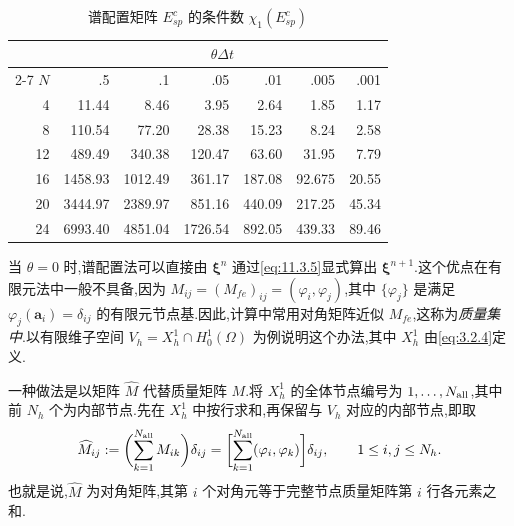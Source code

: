 \begin{table}[htbp]
  \centering
  \caption{谱配置矩阵 \(E_{sp}^c\) 的条件数 \(\chi_1(E_{sp}^c)\)}\label{tab:11.4.2}
  \begin{tabular}{rrrrrrr}
    \toprule
       & \multicolumn{6}{c}{\(\theta\Delta t\)}\\
    \cmidrule(lr){2-7}
    \(N\) & .5 & .1 & .05 & .01 & .005 & .001\\
    \midrule
     4 &   11.44 &    8.46 &    3.95 &   2.64 &   1.85  &  1.17\\
     8 &  110.54 &   77.20 &   28.38 &  15.23 &   8.24  &  2.58\\
    12 &  489.49 &  340.38 &  120.47 &  63.60 &  31.95  &  7.79\\
    16 & 1458.93 & 1012.49 &  361.17 & 187.08 &  92.675 & 20.55\\
    20 & 3444.97 & 2389.97 &  851.16 & 440.09 & 217.25  & 45.34\\
    24 & 6993.40 & 4851.04 & 1726.54 & 892.05 & 439.33  & 89.46\\
    \bottomrule
  \end{tabular}
\end{table}

当 \(\theta=0\) 时,谱配置法可以直接由 \(\boldsymbol{\xi}^n\) 通过\eqref{eq:11.3.5}显式算出 \(\boldsymbol{\xi}^{n+1}\).这个优点在有限元法中一般不具备,因为 \(M_{ij}=(M_{fe})_{ij}=(\varphi_i,\varphi_j)\),其中 \(\{\varphi_j\}\) 是满足 \(\varphi_j(\boldsymbol{a}_i)=\delta_{ij}\) 的有限元节点基.因此,计算中常用对角矩阵近似 \(M_{fe}\),这称为\emph{质量集中}.以有限维子空间 \(V_h=X_h^1\cap H_0^1(\Omega)\) 为例说明这个办法,其中 \(X_h^1\) 由\eqref{eq:3.2.4}定义.

一种做法是以矩阵 \(\widehat M\) 代替质量矩阵 \(M\).将 \(X_h^1\) 的全体节点编号为 \(1,\ldots,N_{\rm all}\),其中前 \(N_h\) 个为内部节点.先在 \(X_h^1\) 中按行求和,再保留与 \(V_h\) 对应的内部节点,即取
\begin{equation}\label{eq:11.4.4}
  \widehat M_{ij}
  :=\biggl(\sum_{k=1}^{N_{\rm all}} M_{ik}\biggr)\delta_{ij}
  =\biggl[\sum_{k=1}^{N_{\rm all}}(\varphi_i,\varphi_k)\biggr]\delta_{ij},
  \qquad 1\le i,j\le N_h.
\end{equation}
也就是说,\(\widehat M\) 为对角矩阵,其第 \(i\) 个对角元等于完整节点质量矩阵第 \(i\) 行各元素之和.

